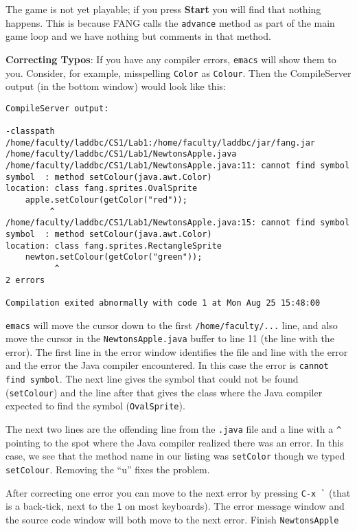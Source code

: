 \documentclass[12pt,twoside]{memoir}
\newcommand\code[1]{\lstinline^#1^}
\newcommand\fname[1]{\lstinline^#1^}
\newcounter{ProgrammingProblem}
\newenvironment{LabExercises}{%
\renewcommand{\ExerciseListName}{Question}%
\renewcommand{\ExerciseListHeader}{\textbf{%
   Checkpoint\ExerciseHeaderNB. }}
\begin{ExerciseList}}%
{\end{ExerciseList}}
\newcommand{\LabExercise}{\Exercise[name={Lab Phase\ExerciseHeaderNB},counter={ProgrammingProblem}]}
\begin{document}
\begin{LabExercises}
The game is not yet playable; if you press \textbf{Start} you will
find that nothing happens. This is because FANG calls the
\code{advance} method as part of the main game loop and we have
nothing but comments in that method.

\textbf{Correcting Typos}: If you have any compiler errors,
\code{emacs} will show them to you. Consider, for example, misspelling
\code{Color} as \code{Colour}. Then the CompileServer output (in the
bottom window) would look like this:

\begin{lstlisting}[numbers=none]
CompileServer output:

-classpath /home/faculty/laddbc/CS1/Lab1:/home/faculty/laddbc/jar/fang.jar 
/home/faculty/laddbc/CS1/Lab1/NewtonsApple.java
/home/faculty/laddbc/CS1/Lab1/NewtonsApple.java:11: cannot find symbol
symbol  : method setColour(java.awt.Color)
location: class fang.sprites.OvalSprite
    apple.setColour(getColor("red"));
         ^
/home/faculty/laddbc/CS1/Lab1/NewtonsApple.java:15: cannot find symbol
symbol  : method setColour(java.awt.Color)
location: class fang.sprites.RectangleSprite
    newton.setColour(getColor("green"));
          ^
2 errors

Compilation exited abnormally with code 1 at Mon Aug 25 15:48:00  
\end{lstlisting}

\code{emacs} will move the cursor down to the first
\code{/home/faculty/...} line, and also move the cursor in the
\fname{NewtonsApple.java} buffer to line 11 (the line with the
error). The first line in the error window identifies the file and
line with the error and the error the Java compiler encountered. In
this case the error is \code{cannot find symbol}. The next line gives
the symbol that could not be found (\code{setColour}) and the line
after that gives the class where the Java compiler expected to find
the symbol (\code{OvalSprite}).

The next two lines are the offending line from the \fname{.java} file
and a line with a \lstinline{^} pointing to the spot where the Java
compiler realized there was an error. In this case, we see that the
method name in our listing was \code{setColor} though we typed
\code{setColour}. Removing the ``u'' fixes the problem.

After correcting one error you can move to the next error by pressing
\code{C-x `} (that is a back-tick, next to the \code{1} on most
keyboards).  The error message window and the source code window will
both move to the next error.
\newpage
\LabExercise Finish \texttt{NewtonsApple}


\end{LabExercises}
\end{document}
